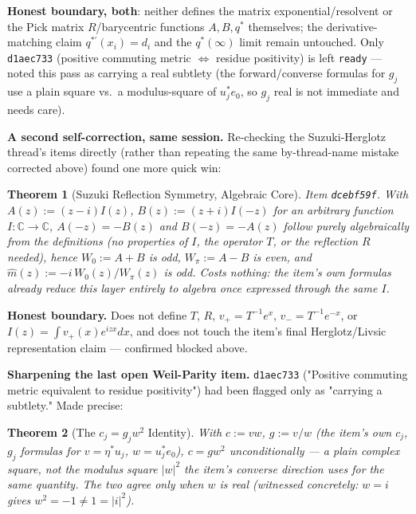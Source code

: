 \documentclass{report}
\newtheorem{theorem}{Theorem}[chapter]
\theoremstyle{definition}
\begin{document}
\textbf{Honest boundary, both}: neither defines the matrix exponential/resolvent or the
Pick matrix $R$/barycentric functions $A,B,q^*$ themselves; the derivative-matching claim
$q^{*\prime}(x_i)=d_i$ and the $q^*(\infty)$ limit remain untouched. Only \texttt{d1aec733}
(positive commuting metric $\Leftrightarrow$ residue positivity) is left \texttt{ready} ---
noted this pass as carrying a real subtlety (the forward/converse formulas for $g_j$ use a
plain square vs.\ a modulus-square of $u_j^*e_0$, so $g_j$ real is not immediate and needs
care).

\textbf{A second self-correction, same session.} Re-checking the Suzuki-Herglotz thread's
items directly (rather than repeating the same by-thread-name mistake corrected above)
found one more quick win:

\begin{theorem}[Suzuki Reflection Symmetry, Algebraic Core]
  \label{thm:suzuki-reflection-symmetry}
  \leanok
  Item \texttt{dcebf59f}. With $A(z):=(z-i)I(z)$, $B(z):=(z+i)I(-z)$ for an
  \emph{arbitrary} function $I:\mathbb{C}\to\mathbb{C}$, $A(-z)=-B(z)$ and $B(-z)=-A(z)$
  follow purely algebraically from the definitions (no properties of $I$, the operator
  $T$, or the reflection $R$ needed), hence $W_0:=A+B$ is odd, $W_\pi:=A-B$ is even, and
  $\hat m(z):=-i\,W_0(z)/W_\pi(z)$ is odd. Costs nothing: the item's own formulas already
  reduce this layer entirely to algebra once expressed through the same $I$.
\end{theorem}

\textbf{Honest boundary.} Does not define $T$, $R$, $v_+=T^{-1}e^x$, $v_-=T^{-1}e^{-x}$, or
$I(z)=\int v_+(x)e^{izx}dx$, and does not touch the item's final Herglotz/Livsic
representation claim --- confirmed blocked above.

\textbf{Sharpening the last open Weil-Parity item.} \texttt{d1aec733} ("Positive commuting
metric equivalent to residue positivity") had been flagged only as "carrying a subtlety."
Made precise:

\begin{theorem}[The $c_j = g_j w^2$ Identity]
  \label{thm:weilparity-cj-gj-mismatch}
  \leanok
  With $c:=vw$, $g:=v/w$ (the item's own $c_j$, $g_j$ formulas for $v=\eta^*u_j$,
  $w=u_j^*e_0$), $c=g w^2$ unconditionally --- a \emph{plain} complex square, not the
  modulus square $|w|^2$ the item's converse direction uses for the same quantity. The two
  agree only when $w$ is real (witnessed concretely: $w=i$ gives $w^2=-1\ne1=|i|^2$).
\end{theorem}
\end{document}

